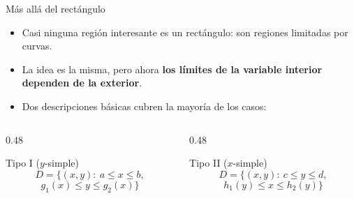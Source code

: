 \documentclass[11pt,aspectratio=169]{beamer}
\begin{document}
\begin{frame}{Más allá del rectángulo}
  \begin{itemize}
    \item Casi ninguna región interesante es un rectángulo: son regiones limitadas por curvas.
    \pause
    \item La idea es la misma, pero ahora \textbf{los límites de la variable interior dependen de la exterior}.
    \pause
    \item Dos descripciones básicas cubren la mayoría de los casos:
  \end{itemize}
  \vspace{8pt}
  \pause
  \begin{columns}
    \begin{column}{0.48\textwidth}
      \begin{block}{Tipo I ($y$-simple)}
        \[
          D=\{(x,y):\ a\le x\le b,
        \]
        \[
          g_1(x)\le y\le g_2(x)\}
        \]
      \end{block}
    \end{column}
    \begin{column}{0.48\textwidth}
      \begin{block}{Tipo II ($x$-simple)}
        \[
          D=\{(x,y):\ c\le y\le d,
        \]
        \[
          h_1(y)\le x\le h_2(y)\}
        \]
      \end{block}
    \end{column}
  \end{columns}
\end{frame}
\end{document}
